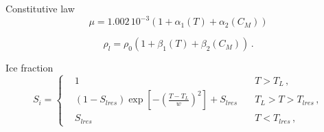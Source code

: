 \documentclass{beamer}
\begin{document}
\begin{frame}{Constitutive law}
		\begin{equation}
			\mu=1.002\, 10^{-3} \left( 1+ \alpha_1(T) +\alpha_2(C_M) \right)
		\end{equation}
		 
		\begin{equation}
			\rho_l =  \rho_0(1+\beta_1(T)+ \beta_2(C_M) )\, .
			\label{consrho}
		\end{equation}
\end{frame}
\begin{frame}{Ice fraction}
\begin{equation}
S_i=\left\{
\begin{aligned}
&1 \quad & T > T_L \,,\\
&(1-S_{lres})\exp\left[ - \left( \frac{T-T_L}{w}\right)^2 \right] +
S_{lres} \quad & T_L> T > T_{lres}\,,\\
&S_{lres}  \quad &  T < T_{lres}\,,
\end{aligned}
\right.
\end{equation}
\end{frame}
\end{document}
